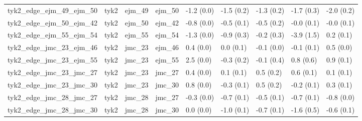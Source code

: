 \begin{tabular}{lllllllll}
tyk2\_edge\_ejm\_49\_ejm\_50          &      tyk2 &      ejm\_49 &      ejm\_50 &  -1.2 (0.0) &        -1.5 (0.2) &  -1.3 (0.2) &  -1.7 (0.3) &  -2.0 (0.2) \\
tyk2\_edge\_ejm\_50\_ejm\_42          &      tyk2 &      ejm\_50 &      ejm\_42 &  -0.8 (0.0) &        -0.5 (0.1) &  -0.5 (0.2) &  -0.0 (0.1) &  -0.0 (0.1) \\
tyk2\_edge\_ejm\_55\_ejm\_54          &      tyk2 &      ejm\_55 &      ejm\_54 &  -1.3 (0.0) &        -0.9 (0.3) &  -0.2 (0.3) &  -3.9 (1.5) &   0.2 (0.1) \\
tyk2\_edge\_jmc\_23\_ejm\_46          &      tyk2 &      jmc\_23 &      ejm\_46 &   0.4 (0.0) &         0.0 (0.1) &  -0.1 (0.0) &  -0.1 (0.1) &   0.5 (0.0) \\
tyk2\_edge\_jmc\_23\_ejm\_55          &      tyk2 &      jmc\_23 &      ejm\_55 &   2.5 (0.0) &        -0.3 (0.2) &  -0.1 (0.4) &   0.8 (0.6) &   0.9 (0.1) \\
tyk2\_edge\_jmc\_23\_jmc\_27          &      tyk2 &      jmc\_23 &      jmc\_27 &   0.4 (0.0) &         0.1 (0.1) &   0.5 (0.2) &   0.6 (0.1) &   0.1 (0.1) \\
tyk2\_edge\_jmc\_23\_jmc\_30          &      tyk2 &      jmc\_23 &      jmc\_30 &   0.8 (0.0) &        -0.3 (0.1) &   0.5 (0.2) &  -0.2 (0.1) &   0.3 (0.1) \\
tyk2\_edge\_jmc\_28\_jmc\_27          &      tyk2 &      jmc\_28 &      jmc\_27 &  -0.3 (0.0) &        -0.7 (0.1) &  -0.5 (0.1) &  -0.7 (0.1) &  -0.8 (0.0) \\
tyk2\_edge\_jmc\_28\_jmc\_30          &      tyk2 &      jmc\_28 &      jmc\_30 &   0.0 (0.0) &        -1.0 (0.1) &  -0.7 (0.1) &  -1.6 (0.5) &  -0.6 (0.1) \\
\bottomrule
\end{tabular}
